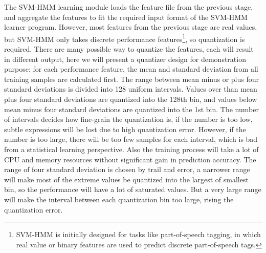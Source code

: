 The SVM-HMM learning module loads the feature file from the previous stage, and aggregate the features to fit the required input format of the SVM-HMM learner program. However, most features from the previous stage are real values, but SVM-HMM only takes discrete performance features\footnote{SVM-HMM is initially designed for tasks like part-of-speech tagging, in which real value or binary features are used to predict discrete part-of-speech tags.}, so quantization is required. There are many possible way to quantize the features, each will result in different output, here we will present a quantizer design for demonstration purpose: for each performance feature, the mean and standard deviation from all training samples are calculated first. The range between mean minus or plus four standard deviations is divided into 128 uniform intervals. Values over than mean plus four standard deviations are quantized into the 128th bin, and values below mean minus four standard deviations are quantized into the 1st bin. The number of intervals decides how fine-grain the quantization is, if the number is too low, subtle expressions will be lost due to high quantization error. However, if the number is too large, there will be too few samples for each interval, which is bad from a statistical learning perspective. Also the training process will take a lot of CPU and memory resources without significant gain in prediction accuracy. The range of four standard deviation is chosen by trail and error, a narrower range will make most of the extreme values be quantized into the largest of smallest bin, so the performance will have a lot of saturated values. But a very large range will make the interval between each quantization bin too large, rising the quantization error. %

